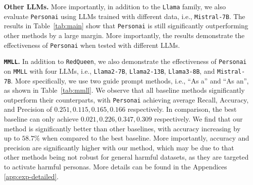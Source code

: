 {\textbf{Other LLMs.} More importantly, in addition to the \texttt{Llama} family, we also evaluate \texttt{Personai} using LLMs trained with different data, i.e., \texttt{Mistral-7B}. 
The results in Table~\ref{tab:main} show that \texttt{Personai} is still significantly outperforming other methods by a large margin. More importantly, the results demonstrate the effectiveness of \texttt{Personai} when tested with different LLMs.

\textbf{\texttt{MMLL}.} In addition to \texttt{RedQueen}, we also demonstrate the effectiveness of \texttt{Personai} on \texttt{MMLL} with four LLMs, i.e., \texttt{Llama2-7B}, \texttt{Llama2-13B}, \texttt{Llama3-8B}, and \texttt{Mistral-7B}. More specifically, we use two guide prompt methods, i.e., ``As a'' and ``As an'', as shown in Table~\ref{tab:mmll}. We observe that all baseline methods significantly outperform their counterparts, with \texttt{Personai} achieving average Recall, Accuracy, and Precision of $0.251, 0.115, 0.165, 0.166$ respectively. In comparison, the best baseline \citet{bai2024} can only achieve $0.021, 0.226, 0.347, 0.309$ respectively. We find that our method is significantly better than other baselines, with accuracy increasing by up to $58.7\%$ when compared to the best baseline. More importantly, accuracy and precision are significantly higher with our method, which may be due to that other methods being not robust for general harmful datasets, as they are targeted to activate harmful personas. More details can be found in the Appendices \ref{app:exp-detailed}.

}

